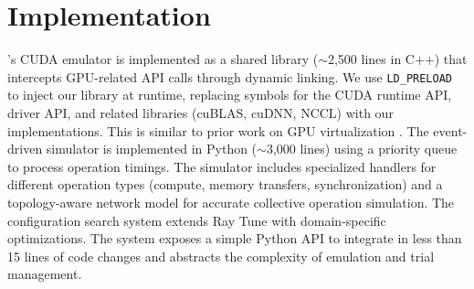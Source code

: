 \section{Implementation}

\sysname's CUDA emulator is implemented as a shared library ($\sim$2,500 lines in C++) that intercepts GPU-related API calls through dynamic linking. We use \texttt{LD\_PRELOAD} to inject our library at runtime, replacing symbols for the CUDA runtime API, driver API, and related libraries (cuBLAS, cuDNN, NCCL) with our implementations. This is similar to prior work on GPU virtualization \cite{singularity}. The event-driven simulator is implemented in Python ($\sim$3,000 lines) using a priority queue to process operation timings. The simulator includes specialized handlers for different operation types (compute, memory transfers, synchronization) and a topology-aware network model for accurate collective operation simulation. The configuration search system extends Ray Tune \cite{ray-tune} with domain-specific optimizations. The system exposes a simple Python API to integrate \syssearchname in less than 15 lines of code changes and  abstracts the complexity of emulation and trial management.












